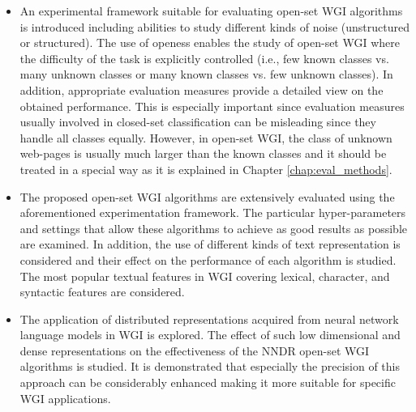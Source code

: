 \begin{itemize}
\begin{itemize}
\item An experimental framework suitable for evaluating open-set WGI algorithms is introduced including abilities to study different kinds of noise (unstructured or structured). The use of openess enables the study of open-set WGI where the difficulty of the task is explicitly controlled (i.e., few known classes vs. many unknown classes or many known classes vs. few unknown classes). In addition, appropriate evaluation measures provide a detailed view on the obtained performance. This is especially important since evaluation measures usually involved in closed-set classification can be misleading since they handle all classes equally. However, in open-set WGI, the class of unknown web-pages is usually much larger than the known classes and it should be treated in a special way as it is explained in Chapter \ref{chap:eval_methods}. 
\item The proposed open-set WGI algorithms are extensively evaluated using the aforementioned experimentation framework. The particular hyper-parameters and settings that allow these algorithms to achieve as good results as possible are examined. In addition, the use of different kinds of text representation is considered and their effect on the performance of each algorithm is studied. The most popular textual features in WGI covering lexical, character, and syntactic features are considered.
\item The application of distributed representations acquired from neural network language models in WGI is explored. The effect of such low dimensional and dense representations on the effectiveness of the NNDR open-set WGI algorithms is studied. It is demonstrated that especially the precision of this approach can be considerably enhanced making it more suitable for specific WGI applications.


\end{itemize}


\end{itemize}
